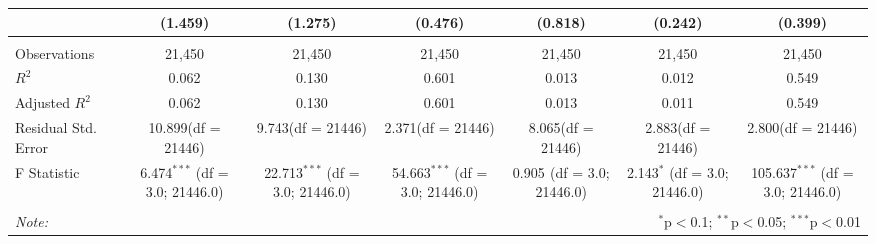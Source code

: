 \documentclass[12pt]{article}
\begin{document}
\begin{table}[!htbp]
\begin{tabular}{@{\extracolsep{5pt}}lcccccc}
  & (1.459) & (1.275) & (0.476) & (0.818) & (0.242) & (0.399) \\
\hline \\[-1.8ex]
 Observations & 21,450 & 21,450 & 21,450 & 21,450 & 21,450 & 21,450 \\
 $R^2$ & 0.062 & 0.130 & 0.601 & 0.013 & 0.012 & 0.549 \\
 Adjusted $R^2$ & 0.062 & 0.130 & 0.601 & 0.013 & 0.011 & 0.549 \\
 Residual Std. Error & 10.899(df = 21446) & 9.743(df = 21446) & 2.371(df = 21446) & 8.065(df = 21446) & 2.883(df = 21446) & 2.800(df = 21446)  \\
 F Statistic & 6.474$^{***}$ (df = 3.0; 21446.0) & 22.713$^{***}$ (df = 3.0; 21446.0) & 54.663$^{***}$ (df = 3.0; 21446.0) & 0.905$^{}$ (df = 3.0; 21446.0) & 2.143$^{*}$ (df = 3.0; 21446.0) & 105.637$^{***}$ (df = 3.0; 21446.0) \\
\hline
\hline \\[-1.8ex]
\textit{Note:} & \multicolumn{6}{r}{$^{*}$p$<$0.1; $^{**}$p$<$0.05; $^{***}$p$<$0.01} \\
\end{tabular}
\end{table}
\end{document}
